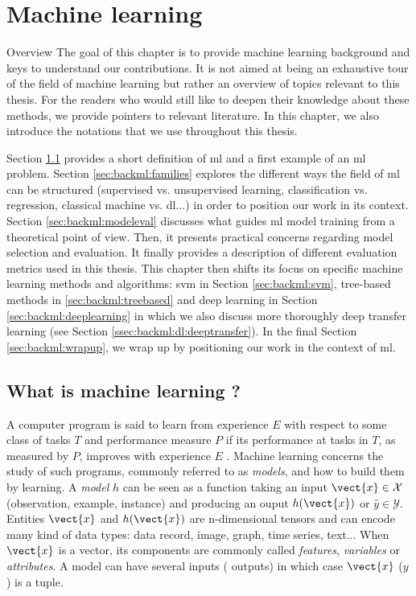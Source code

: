 \chapter{Machine learning}
\label{chap:backml}

\begin{overview}{Overview}
The goal of this chapter is to provide machine learning background and keys to understand our contributions. It is not aimed at being an exhaustive tour of the field of machine learning but rather an overview of topics relevant to this thesis. For the readers who would still like to deepen their knowledge about these methods, we provide pointers to relevant literature. In this chapter, we also introduce the notations that we use throughout this thesis.

Section \ref{sec:backml:whatisml} provides a short definition of \acrlong{ml} and a first example of an \acrshort{ml} problem. Section \ref{sec:backml:families} explores the different ways the field of \acrlong{ml} can be structured (\eg supervised vs. unsupervised learning, classification vs. regression, classical machine vs. \acrlong{dl}...) in order to position our work in its context. Section \ref{sec:backml:modeleval} discusses what guides \acrlong{ml} model training from a theoretical point of view. Then, it presents practical concerns regarding model selection and evaluation. It finally provides a description of different evaluation metrics used in this thesis. This chapter then shifts its focus on specific machine learning methods and algorithms: \acrlong{svm} in Section \ref{sec:backml:svm}, tree-based methods in \ref{sec:backml:treebased} and deep learning in Section \ref{sec:backml:deeplearning} in which we also discuss more thoroughly deep transfer learning (see Section \ref{ssec:backml:dl:deeptransfer}). In the final Section \ref{sec:backml:wrapup}, we wrap up by positioning our work in the context of \acrlong{ml}.
\end{overview}

\section{What is machine learning ?}
\label{sec:backml:whatisml}

A computer program is said to learn from experience $E$ with respect to some class
of tasks $T$ and performance measure $P$ if its performance at tasks in $T$, as
measured by $P$, improves with experience $E$ \cite{mitchell1997machine}.
Machine learning concerns the study of such programs, commonly referred to as
\textit{models}, and how to build them by learning. A \textit{model} $h$ can be
seen as a function taking an input $\vect{x} \in \mathcal{X}$ (\aka observation,
example, instance) and producing an ouput $h(\vect{x})$ or $\hat{y} \in \mathcal{Y}$.
Entities $\vect{x}$ and $h(\vect{x})$ are n-dimensional tensors and can encode
many kind of data types: data record, image, graph, time series, text... When
$\vect{x}$ is a vector, its components are commonly called \textit{features},
\textit{variables} or \textit{attributes}. A model can have several inputs (\resp
outputs) in which case $\vect{x}$ (\resp $y$) is a tuple.

